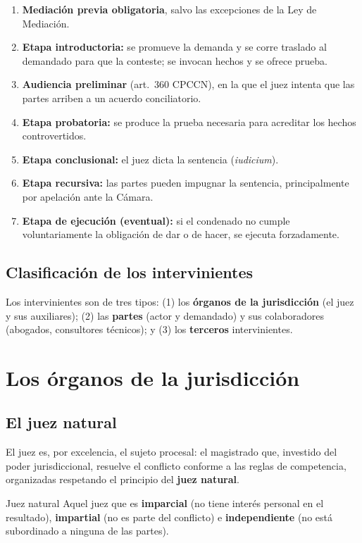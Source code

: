 \documentclass[12pt,oneside]{book}
\begin{document}
\begin{enumerate}
\item \textbf{Mediación previa obligatoria}, salvo las excepciones de la Ley de Mediación.
\item \textbf{Etapa introductoria:} se promueve la demanda y se corre traslado al demandado para que la conteste; se invocan hechos y se ofrece prueba.
\item \textbf{Audiencia preliminar} (art.~360 CPCCN), en la que el juez intenta que las partes arriben a un acuerdo conciliatorio.
\item \textbf{Etapa probatoria:} se produce la prueba necesaria para acreditar los hechos controvertidos.
\item \textbf{Etapa conclusional:} el juez dicta la sentencia (\textit{iudicium}).
\item \textbf{Etapa recursiva:} las partes pueden impugnar la sentencia, principalmente por apelación ante la Cámara.
\item \textbf{Etapa de ejecución (eventual):} si el condenado no cumple voluntariamente la obligación de dar o de hacer, se ejecuta forzadamente.
\end{enumerate}

\subsection{Clasificación de los intervinientes}

Los intervinientes son de tres tipos: (1) los \textbf{órganos de la jurisdicción} (el juez y sus auxiliares); (2) las \textbf{partes} (actor y demandado) y sus colaboradores (abogados, consultores técnicos); y (3) los \textbf{terceros} intervinientes.

\section{Los órganos de la jurisdicción}

\subsection{El juez natural}

El juez es, por excelencia, el sujeto procesal: el magistrado que, investido del poder jurisdiccional, resuelve el conflicto conforme a las reglas de competencia, organizadas respetando el principio del \textbf{juez natural}.

\begin{definition}{Juez natural}
Aquel juez que es \textbf{imparcial} (no tiene interés personal en el resultado), \textbf{impartial} (no es parte del conflicto) e \textbf{independiente} (no está subordinado a ninguna de las partes).
\end{definition}
\end{document}

